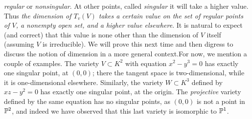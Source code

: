 {\sl regular} or {\sl nonsingular}. At other points, called {\sl singular} it will take a higher value.  Thus {\sl the dimension of $T_v(V)$ takes a certain value on the set of regular points of $V$, a nonempty open set, and a higher value elsewhere}.  It is natural to expect (and correct) that this value is none other than the dimension of $V$ itself (assuming $V$ is irreducible).  We will prove this next time and then digress to discuss the notion of dimension in a more general context.For now, we mention a couple of examples.  The variety $V\subset K^2$ with equation $x^2 - y^3 = 0$ has exactly one singular point, at $(0,0)$; there the tangent space is two-dimensional, while it is one-dimensional elsewhere.  Similarly, the variety $W\subset K^3$ defined by $xz - y^2 = 0$ has exactly one singular point, at the origin.  The {\sl projective} variety defined by the same equation has no singular points, as $(0,0)$ is not a point in $\Bbb P^2$, and indeed we have observed that this last variety is isomorphic to $\Bbb P^1$.